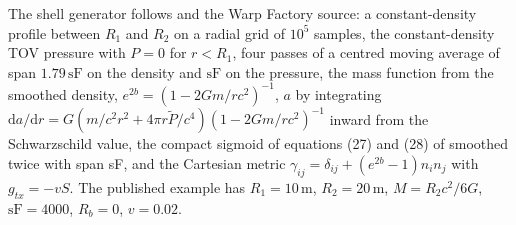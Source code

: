 \documentclass[11pt,a4paper]{article}
\theoremstyle{remark}
\newcommand{\dd}{\mathrm{d}}
\begin{document}
The shell generator follows \cite{Fuchs2024} and the Warp Factory source: a constant-density profile between $R_1$ and $R_2$ on a radial grid of $10^5$ samples, the constant-density TOV pressure with $P = 0$ for $r < R_1$, four passes of a centred moving average of span $1.79\,\mathrm{sF}$ on the density and $\mathrm{sF}$ on the pressure, the mass function from the smoothed density, $e^{2b} = (1 - 2Gm/rc^2)^{-1}$, $a$ by integrating $\dd a/\dd r = G(m/c^2r^2 + 4\pi r\tilde P/c^4)(1-2Gm/rc^2)^{-1}$ inward from the Schwarzschild value, the compact sigmoid of equations (27) and (28) of \cite{Fuchs2024} smoothed twice with span sF, and the Cartesian metric $\gamma_{ij} = \delta_{ij} + (e^{2b}-1)n_in_j$ with $g_{tx} = -vS$. The published example has $R_1 = 10\,\mathrm{m}$, $R_2 = 20\,\mathrm{m}$, $M = R_2c^2/6G$, $\mathrm{sF} = 4000$, $R_b = 0$, $v = 0.02$. 
\end{document}
